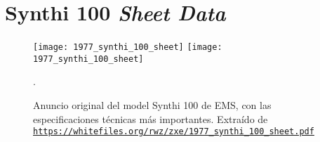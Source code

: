  \chapter[Synthi 100 sheet]{Synthi 100 \textit{Sheet Data}}



\begin{figure}
	\centering
	\texttt{[image: 1977\_synthi\_100\_sheet]}
	\texttt{[image: 1977\_synthi\_100\_sheet]}
	\caption[EMS Synthi 100 \textit{Data Sheet}]{Anuncio original del model Synthi 100 de EMS, con las especificaciones técnicas más importantes.  Extraído de\\ \href{https://whitefiles.org/rwz/zxe/1977\_synthi\_100\_sheet.pdf}{\texttt{https://whitefiles.org/rwz/zxe/1977\_synthi\_100\_sheet.pdf}}}.
	\label{fig:synthi100_sheet}
\end{figure}



